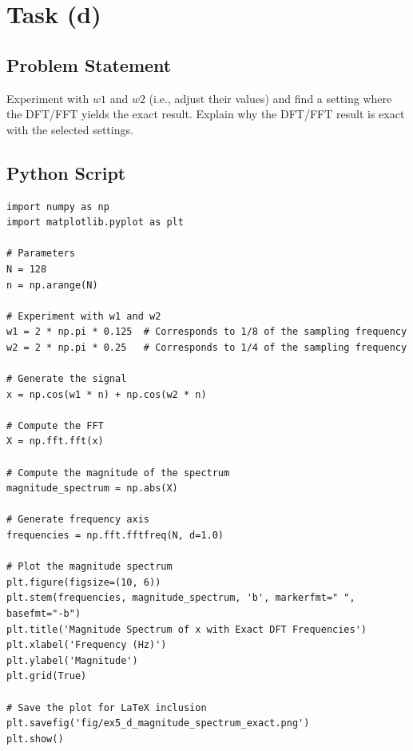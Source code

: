 \item[(d)]
\section*{Task (d)}

\subsection*{Problem Statement}
Experiment with \( w1 \) and \( w2 \) (i.e., adjust their values) and find a setting where the DFT/FFT yields the exact result. Explain why the DFT/FFT result is exact with the selected settings.

\subsection*{Python Script}
\begin{verbatim}
import numpy as np
import matplotlib.pyplot as plt

# Parameters
N = 128
n = np.arange(N)

# Experiment with w1 and w2
w1 = 2 * np.pi * 0.125  # Corresponds to 1/8 of the sampling frequency
w2 = 2 * np.pi * 0.25   # Corresponds to 1/4 of the sampling frequency

# Generate the signal
x = np.cos(w1 * n) + np.cos(w2 * n)

# Compute the FFT
X = np.fft.fft(x)

# Compute the magnitude of the spectrum
magnitude_spectrum = np.abs(X)

# Generate frequency axis
frequencies = np.fft.fftfreq(N, d=1.0)

# Plot the magnitude spectrum
plt.figure(figsize=(10, 6))
plt.stem(frequencies, magnitude_spectrum, 'b', markerfmt=" ", basefmt="-b")
plt.title('Magnitude Spectrum of x with Exact DFT Frequencies')
plt.xlabel('Frequency (Hz)')
plt.ylabel('Magnitude')
plt.grid(True)

# Save the plot for LaTeX inclusion
plt.savefig('fig/ex5_d_magnitude_spectrum_exact.png')
plt.show()
\end{verbatim}

